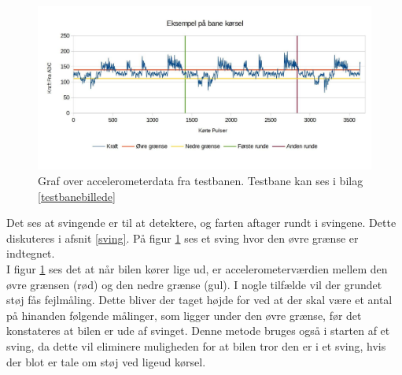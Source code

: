 \begin{figure}[h!]
\centering
\includegraphics[scale=0.25]{./Graphics/banekorsel}
\caption{Graf over accelerometerdata fra testbanen. Testbane kan ses i bilag \ref{testbanebillede}}
\label{testbanegraf}
\end{figure}

Det ses at svingende er til at detektere, og farten aftager rundt i svingene. Dette diskuteres i afsnit \ref{sving}. På figur \ref{testbanegraf} ses et sving hvor den øvre grænse er indtegnet.\\

I figur \ref{testbanegraf} ses det at når bilen kører lige ud, er accelerometerværdien mellem den øvre grænsen (rød) og den nedre grænse (gul). I nogle tilfælde vil der grundet støj fås fejlmåling. Dette bliver der taget højde for ved at der skal være et antal på hinanden følgende målinger, som ligger under den øvre grænse, før det konstateres at bilen er ude af svinget. Denne metode bruges også i starten af et sving, da dette vil eliminere muligheden for at bilen tror den er i et sving, hvis der blot er tale om støj ved ligeud kørsel.\\



